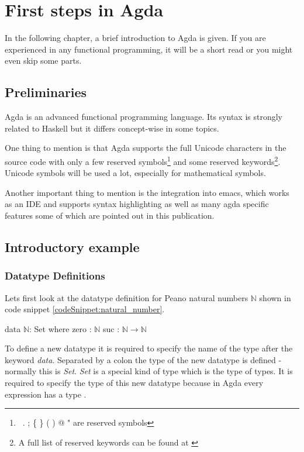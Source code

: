 \section{First steps in Agda}\label{section:first_steps_in_agda}
In the following chapter, a brief introduction to Agda is given. If you are experienced in any functional programming, it will be a short read or you might even skip some parts.

\subsection{Preliminaries}
Agda is an advanced functional programming language. Its syntax is strongly related to Haskell but it differs concept-wise in some topics. 

One thing to mention is that Agda supports the full Unicode characters in the source code with only a few reserved symbols\footnote{\, . ; \{ \} ( ) @ " are reserved symbols\cite{AgdaReadTheDocsStructure}} 
and some reserved keywords\footnote{A full list of reserved keywords can be found at \cite{AgdaReadTheDocsStructure}}. 
Unicode symbols will be used a lot, especially for mathematical symbols.

Another important thing to mention is the integration into emacs, which works as an IDE and supports syntax highlighting as well as many agda specific features some of which are pointed out in this publication.

\subsection{Introductory example}\label{section:agda_introduction_example}
\subsubsection{Datatype Definitions}
Lets first look at the datatype definition for Peano natural numbers $\mathbb{N}$ shown in code snippet \ref{codeSnippet:natural_number}.

\begin{codesnippet}[mathescape=true, caption={Definition of the peano natural numbers datatype in Agda}, label={codeSnippet:natural_number}]
data $\mathbb{N}$: Set where
  zero : $\mathbb{N}$
  suc  : $\mathbb{N} \rightarrow \mathbb{N}$
\end{codesnippet}

To define a new datatype it is required to specify the name of the type after the keyword \emph{data}.
Separated by a colon the type of the new datatype is defined - normally this is \emph{Set}.
\emph{Set} is a special kind of type which is the type of types.
It is required to specify the type of this new datatype because in Agda every expression has a type \cite{norell:deptyped}.

